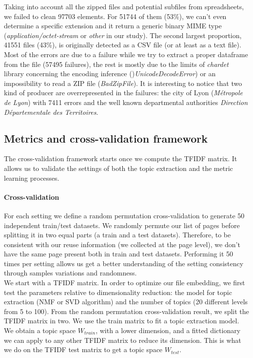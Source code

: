 \documentclass[a4paper]{article}
\begin{document}
	Taking into account all the zipped files and potential subfiles from spreadsheets, we failed to clean 97703 elements. For 51744 of them (53\%), we can't even determine a specific extension and it return a generic binary MIME type (\emph{application/octet-stream} or \emph{other} in our study). The second largest proportion, 41551 files (43\%), is originally detected as a CSV file (or at least as a text file). Most of the errors are due to a failure while we try to extract a proper dataframe from the file (57495 failures), the rest is mostly due to the limits of \emph{chardet} library concerning the encoding inference ()\emph{UnicodeDecodeError}) or an impossibility to read a ZIP file (\emph{BadZipFile}). It is interesting to notice that two kind of producer are overrepresented in the failures: the city of Lyon (\emph{Métropole de Lyon}) with 7411 errors and the well known departmental authorities \emph{Direction Départementale des Territoires}.
	
	\subsection{Metrics and cross-validation framework}
	
	The cross-validation framework starts once we compute the \ac{TFIDF} matrix. It allows us to validate the settings of both the topic extraction and the metric learning processes.
	
	
	\paragraph{Cross-validation}
	
	For each setting we define a random permutation cross-validation to generate 50 independent train/test datasets. We randomly permute our list of pages before splitting it in two equal parts (a train and a test datasets). Therefore, to be consistent with our reuse information (we collected at the page level), we don't have the same page present both in train and test datasets. Performing it 50 times per setting allows us get a better understanding of the setting consistency through samples variations and randomness.\\
	
	We start with a \ac{TFIDF} matrix. In order to optimize our file embedding, we first test the parameters relative to dimensionality reduction: the model for topic extraction (\ac{NMF} or \ac{SVD} algorithm) and the number of topics (20 different levels from 5 to 100). From the random permutation cross-validation result, we split the \ac{TFIDF} matrix in two. We use the train matrix to fit a topic extraction model. We obtain a topic space $W_{train}$, with a lower dimension, and a fitted dictionary we can apply to any other \ac{TFIDF} matrix to reduce its dimension. This is what we do on the \ac{TFIDF} test matrix to get a topic space $W_{test}$. 
	
\end{document}
